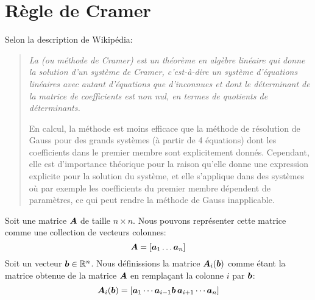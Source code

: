\section{Règle de Cramer}
Selon la description de Wikipédia:
\begin{quotation}
\itshape
La  (ou méthode de Cramer) est un théorème en algèbre linéaire qui donne la solution d'un système de Cramer, c'est-à-dire un système d'équations linéaires avec autant d'équations que d'inconnues et dont le déterminant de la matrice de coefficients est non nul, en termes de quotients de déterminants.

En calcul, la méthode est moins efficace que la méthode de résolution de Gauss pour des grands systèmes (à partir de 4 équations) dont les coefficients dans le premier membre sont explicitement donnés. Cependant, elle est d'importance théorique pour la raison qu'elle donne une expression explicite pour la solution du système, et elle s'applique dans des systèmes où par exemple les coefficients du premier membre dépendent de paramètres, ce qui peut rendre la méthode de Gauss inapplicable.
\end{quotation}
\begin{defini}
Soit une matrice $\boldsymbol{A}$ de taille $n\times  n$. Nous pouvons représenter cette matrice comme une collection
de vecteurs colonnes:
\[
\boldsymbol{A} = [\boldsymbol{a}_1 \ldots \boldsymbol{a}_n]
\]
Soit un vecteur $\boldsymbol{b} \in \mathbb{R}^n$.  Nous définissions la matrice $\boldsymbol{A}_i(\boldsymbol{b})$ comme étant la matrice
obtenue de la matrice $\boldsymbol{A}$ en remplaçant la colonne $i$ par $\boldsymbol{b}$:
\[
\boldsymbol{A}_i(\boldsymbol{b}) = [\boldsymbol{a}_1 \cdots \boldsymbol{a}_{i-1} \boldsymbol{b} \,\boldsymbol{a}_{i+1} \cdots \boldsymbol{a}_n]
\]
\end{defini}
